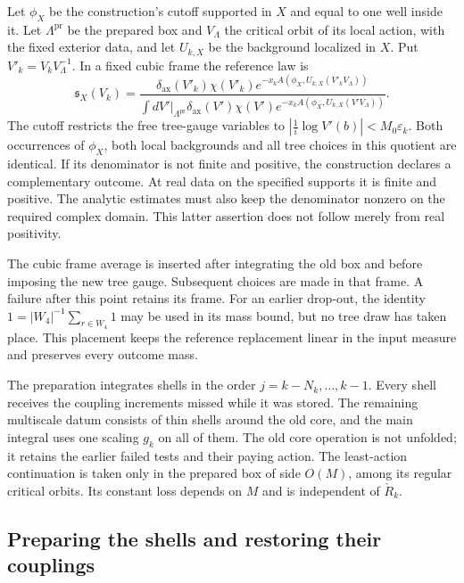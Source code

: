 \documentclass[11pt,letterpaper,reqno]{amsart}
\theoremstyle{definition}
\theoremstyle{remark}
\begin{document}
Let $\phi_X$ be the construction's cutoff supported in $X$ and
equal to one well inside it. Let $\Lambda^{\mathrm{pr}}$ be the prepared box and
$V_\Lambda$ the critical orbit of its local action, with
the fixed exterior data, and let $U_{k,X}$ be the background localized
in $X$. Put $V'_k=V_kV_\Lambda^{-1}$.
In a fixed cubic frame the reference law is
\begin{equation}\label{eq:mrg-reference-law}
 \mathfrak s_X(V_k)=
 \frac{\delta_{\mathrm{ax}}(V'_k)\chi(V'_k)
       e^{-x_kA(\phi_X,U_{k,X}(V'_kV_\Lambda))}}
 {\displaystyle\int dV'|_{\Lambda^{\mathrm{pr}}}
       \delta_{\mathrm{ax}}(V')\chi(V')
       e^{-x_kA(\phi_X,U_{k,X}(V'V_\Lambda))}}.
\end{equation}
The cutoff restricts the free tree-gauge variables to
$|\frac1i\log V'(b)|<M_0\varepsilon_k$.
Both occurrences of $\phi_X$, both local backgrounds and
all tree choices in this quotient are identical.
If its denominator is not finite and positive, the
construction declares a complementary outcome. At real
data on the specified supports it is finite and positive.
The analytic estimates must also keep the denominator
nonzero on the required complex domain. This latter
assertion does not follow merely from real positivity.

The cubic frame average is inserted after integrating
the old box and before imposing the new tree gauge.
Subsequent choices are made in that frame. A failure
after this point retains its frame. For an earlier
drop-out, the identity
$1=|W_4|^{-1}\sum_{r\in W_4}1$ may be used in its mass
bound, but no tree draw has taken place. This placement
keeps the reference replacement linear in the input
measure and preserves every outcome mass.

The preparation integrates shells in the order
$j=k-N_k,\ldots,k-1$. Every shell receives the coupling
increments missed while it was stored. The remaining
multiscale datum consists of thin shells around the old
core, and the main integral uses one scaling $g_k$ on
all of them. The old core operation is not unfolded;
it retains the earlier failed tests and their paying
action. The least-action continuation is taken only
in the prepared box of side $O(M)$, among its regular
critical orbits. Its constant loss depends on $M$ and
is independent of $\check R_k$.

\subsection{Preparing the shells and restoring their couplings}
\end{document}
